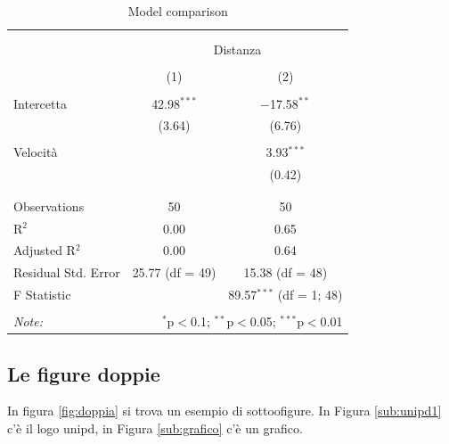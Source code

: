 \documentclass[
]{article}
\begin{document}
\begin{table}[!htbp] \centering 
  \caption{Model comparison} 
  \label{tab:modelli} 
\begin{tabular}{@{\extracolsep{5pt}}lcc} 
\\[-1.8ex]\hline 
\hline \\[-1.8ex] 
\\[-1.8ex] & \multicolumn{2}{c}{Distanza} \\ 
\\[-1.8ex] & (1) & (2)\\ 
\hline \\[-1.8ex] 
 Intercetta & 42.98$^{***}$ & $-$17.58$^{**}$ \\ 
  & (3.64) & (6.76) \\ 
  & & \\ 
 Velocità &  & 3.93$^{***}$ \\ 
  &  & (0.42) \\ 
  & & \\ 
\hline \\[-1.8ex] 
Observations & 50 & 50 \\ 
R$^{2}$ & 0.00 & 0.65 \\ 
Adjusted R$^{2}$ & 0.00 & 0.64 \\ 
Residual Std. Error & 25.77 (df = 49) & 15.38 (df = 48) \\ 
F Statistic &  & 89.57$^{***}$ (df = 1; 48) \\ 
\hline 
\hline \\[-1.8ex] 
\textit{Note:}  & \multicolumn{2}{r}{$^{*}$p$<$0.1; $^{**}$p$<$0.05; $^{***}$p$<$0.01} \\ 
\end{tabular} 
\end{table}

\hypertarget{le-figure-doppie}{%
\subsection{Le figure doppie}\label{le-figure-doppie}}

In figura \ref{fig:doppia} si trova un esempio di sottoofigure. In
Figura \ref{sub:unipd1} c'è il logo unipd, in Figura \ref{sub:grafico}
c'è un grafico.
\end{document}
